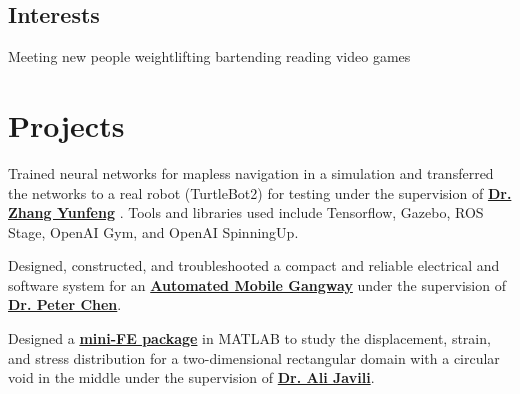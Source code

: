 \documentclass[]{deedy-resume-openfont}
\begin{document}
\begin{minipage}[t]{0.33\textwidth}
\subsection{Interests}
Meeting new people \textbullet{} weightlifting \textbullet{} bartending \textbullet{} reading \textbullet{} video games\\
\sectionsep

%
%

\end{minipage} 
\hfill
\begin{minipage}[t]{0.65\textwidth} 



\section{Projects}
Trained neural networks for mapless navigation in a simulation and transferred the networks to a real robot (TurtleBot2) for testing under the supervision of \textbf{\href{https://www.eng.nus.edu.sg/me/staff/zhang-yunfeng/}{Dr. Zhang Yunfeng}} . Tools and libraries used include Tensorflow, Gazebo, ROS Stage, OpenAI Gym, and OpenAI SpinningUp.
\sectionsep

Designed, constructed, and troubleshooted a compact and reliable electrical and software system for an \textbf{\href{https://github.com/watate/Automated-Mobile-Gangway}{Automated Mobile Gangway}} under the supervision of \textbf{\href{https://www.eng.nus.edu.sg/me/staff/chen-chao-yu-peter/}{Dr. Peter Chen}}.
\sectionsep

Designed a \textbf{\href{https://github.com/watate/FEM}{mini-FE package}} in MATLAB to study the displacement, strain, and stress distribution for a two-dimensional rectangular domain with a circular void in the middle under the supervision of \textbf{\href{https://www.researchgate.net/profile/Ali_Javili}{Dr. Ali Javili}}.
\sectionsep




\end{minipage}
\end{document}
